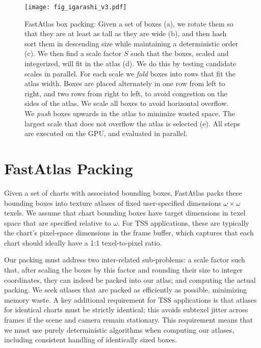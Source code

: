 \begin{figure*}[t]
\vspace{-10pt}
\texttt{[image: fig\_igarashi\_v3.pdf]}
\caption{FastAtlas box packing: Given a set of boxes (a), we rotate them so that they are at least as tall as they are wide (b), and then hash sort them in descending size while maintaining a deterministic order (c). We then find a scale factor $S$ such that the boxes, scaled and integerized, will fit in the atlas (d). We do this by testing candidate scales in parallel. For each scale we {\em fold} boxes into rows that fit the atlas width. Boxes are placed alternately in one row from left to right, and two rows from right to left, to avoid congestion on the sides of the atlas. We scale all boxes to avoid horizontal overflow. We {\em push} boxes upwards in the atlas to minimize wasted space. The largest scale that does not overflow the atlas is selected (e). All steps are executed on the GPU, and evaluated in parallel.}
\vspace{-10pt}
\label{fig:igarashi_packing}
\end{figure*}

\section{FastAtlas Packing}
\label{sec:pack}
\label{sec:atlasing}
\label{sec:packing}

Given a set of charts with associated bounding boxes, FastAtlas packs these bounding boxes into texture atlases of fixed user-specified dimensions $\omega \times \omega$ texels. We assume that chart bounding boxes have target dimensions in texel space that are specified relative to $\omega$. For TSS applications, these are typically the chart's pixel-space dimensions in the frame buffer, which captures that each chart should ideally have a 1:1 texel-to-pixel ratio.

Our packing must address two inter-related sub-problems: a scale factor such that, after scaling the boxes by this factor and rounding their size to integer coordinates, they can indeed be packed into our atlas; and computing the actual packing. We seek atlases that are packed as efficiently as possible, minimizing memory waste. A key additional requirement for TSS applications is that atlases for identical charts must be strictly identical; this avoids subtexel jitter across frames if the scene and camera remain stationary. This requirement means that we must use purely deterministic algorithms when computing our atlases, including consistent handling of identically sized boxes.
 
